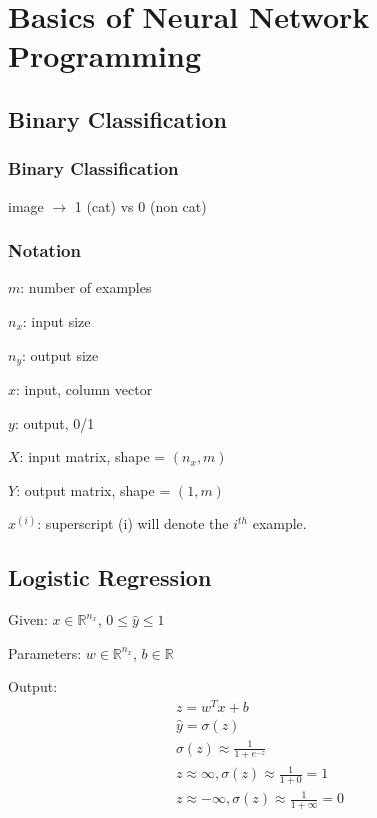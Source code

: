 \newpage{}
\section{Basics of Neural Network Programming}


\subsection{Binary Classification}
\subsubsection{Binary Classification}
image $\rightarrow$ 1 (cat) vs 0 (non cat)

\subsubsection{Notation}
	$m$: number of examples

	$n_x$: input size

	$n_y$: output size

	$x$: input, column vector

	$y$: output, 0/1

	$X$: input matrix, shape = $(n_x, m)$

	$Y$: output matrix, shape = $(1, m)$

	$x^{(i)}$: superscript (i) will denote the $i^{th}$ example.


\subsection{Logistic Regression}
Given:
	$x \in \mathbb{R}^{n_x}$, $0 \le \hat{y} \le 1$

Parameters: 
	$w \in \mathbb{R}^{n_x}$, $b \in \mathbb{R}$

Output: 
\begin{align}
	z = w^Tx + b   \\
	\hat{y} = \sigma{(z)} \\
	\sigma{(z)} \approx \frac{1}{1 + e^{-z}} \\
	z \approx \infty, \sigma{(z)} \approx \frac{1}{1 + 0} = 1 \\
	z \approx -\infty, \sigma{(z)} \approx \frac{1}{1 + \infty} = 0
\end{align}

